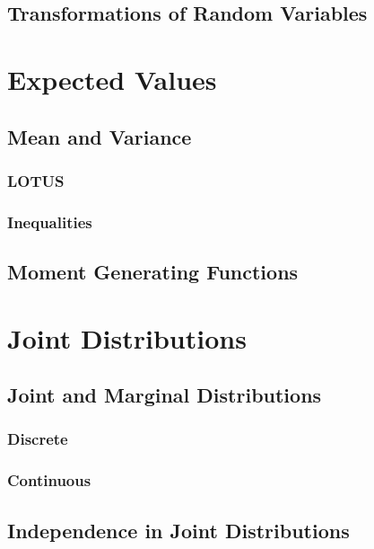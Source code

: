 \documentclass[a4paper,10pt]{article}
\begin{document}
\subsection{Transformations of Random Variables}



\newpage
\section{Expected Values}

\subsection{Mean and Variance}
\subsubsection{LOTUS}
\subsubsection{Inequalities}

\subsection{Moment Generating Functions}



\newpage
\section{Joint Distributions}

\subsection{Joint and Marginal Distributions}
\subsubsection{Discrete}
\subsubsection{Continuous}

\subsection{Independence in Joint Distributions}
\end{document}
